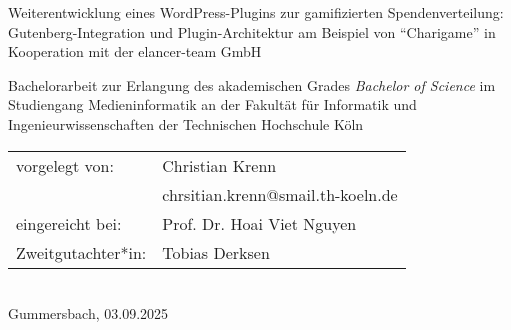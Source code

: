 \begin{titlepage}
%
\sffamily%
%
\begin{center}
\end{center}
%
\vfill
%
\begin{huge}
    Weiterentwicklung eines WordPress-Plugins zur gamifizierten Spendenverteilung:
    Gutenberg-Integration und Plugin-Architektur am Beispiel von ``Charigame'' in Kooperation mit der elancer-team GmbH\\[10mm]
\end{huge}
%
Bachelorarbeit zur Erlangung des akademischen Grades\newline
\emph{Bachelor of Science}\newline
im Studiengang Medieninformatik\newline
an der Fakultät für Informatik und Ingenieurwissenschaften\newline
der Technischen Hochschule Köln
%
\vfill
%
\begin{tabular}{@{}ll}
vorgelegt von: & Christian Krenn\\
               & chrsitian.krenn@smail.th-koeln.de\\[5mm]
eingereicht bei:   & Prof. Dr. Hoai Viet Nguyen\\
Zweitgutachter*in: & Tobias Derksen
\end{tabular}	
%
\\[10mm]
%
Gummersbach, 03.09.2025%
%
\rmfamily%
%
\end{titlepage}